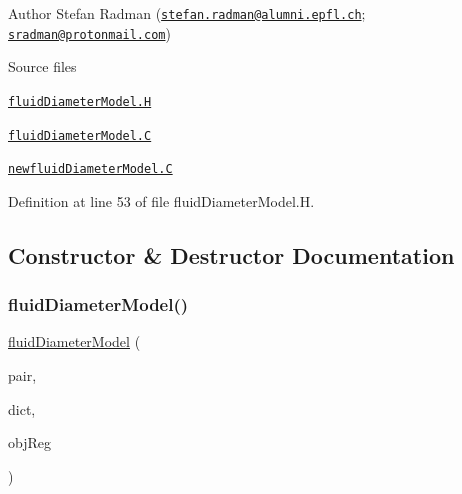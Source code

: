 \label{_Description}%
 Author Stefan Radman (\href{mailto:stefan.radman@alumni.epfl.ch}{\tt stefan.\+radman@alumni.\+epfl.\+ch}; \href{mailto:sradman@protonmail.com}{\tt sradman@protonmail.\+com})

\begin{DoxyParagraph}{Source files}

\begin{DoxyItemize}
\item \href{../../../home/carlo/data/GeN-Foam/GeN-Foam_ffn/GeN-Foam/GeN-Foam/classes/thermalHydraulics/src/physicsModels/fluidDiameterModels/fluidDiameterModel.H}{\tt fluid\+Diameter\+Model.\+H} 
\item \href{../../../home/carlo/data/GeN-Foam/GeN-Foam_ffn/GeN-Foam/GeN-Foam/classes/thermalHydraulics/src/physicsModels/fluidDiameterModels/fluidDiameterModel.C}{\tt fluid\+Diameter\+Model.\+C} 
\item \href{../../../home/carlo/data/GeN-Foam/GeN-Foam_ffn/GeN-Foam/GeN-Foam/classes/thermalHydraulics/src/physicsModels/fluidDiameterModels/newfluidDiameterModel.C}{\tt newfluid\+Diameter\+Model.\+C} 
\end{DoxyItemize}
\end{DoxyParagraph}


Definition at line 53 of file fluid\+Diameter\+Model.\+H.



\subsection{Constructor \& Destructor Documentation}
\mbox{\label{classFoam_1_1fluidDiameterModel_a269b306e6f73e3dade6ca7764e7ce283}} 
\subsubsection{\texorpdfstring{fluid\+Diameter\+Model()}{fluidDiameterModel()}}
{\footnotesize\ttfamily \hyperlink{classFoam_1_1fluidDiameterModel}{fluid\+Diameter\+Model} (\begin{DoxyParamCaption}\item[{const \hyperlink{classFoam_1_1FSPair}{F\+S\+Pair} \&}]{pair,  }\item[{const dictionary \&}]{dict,  }\item[{const object\+Registry \&}]{obj\+Reg }\end{DoxyParamCaption})}



